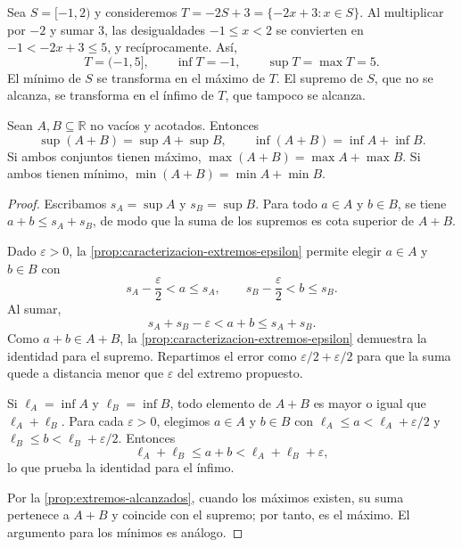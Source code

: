 \begin{example}
Sea $S=[-1,2)$ y consideremos $T=-2S+3=\{-2x+3:x\in S\}$. Al multiplicar por $-2$ y sumar $3$, las desigualdades $-1\leq x<2$ se convierten en $-1<-2x+3\leq5$, y recíprocamente. Así,
\[
 T=(-1,5],\qquad \inf T=-1,\qquad \sup T=\max T=5.
\]
El mínimo de $S$ se transforma en el máximo de $T$. El supremo de $S$, que no se alcanza, se transforma en el ínfimo de $T$, que tampoco se alcanza.
\end{example}

\begin{samepage}
\begin{proposition}
\label{prop:extremos-suma}
Sean $A,B\subseteq\mathbb{R}$ no vacíos y acotados. Entonces
\[
 \sup(A+B)=\sup A+\sup B,\qquad
 \inf(A+B)=\inf A+\inf B.
\]
Si ambos conjuntos tienen máximo, $\max(A+B)=\max A+\max B$. Si ambos tienen mínimo, $\min(A+B)=\min A+\min B$.
\end{proposition}
\end{samepage}

\begin{proof}
Escribamos $s_A=\sup A$ y $s_B=\sup B$. Para todo $a\in A$ y $b\in B$, se tiene $a+b\leq s_A+s_B$, de modo que la suma de los supremos es cota superior de $A+B$.

Dado $\varepsilon>0$, la \cref{prop:caracterizacion-extremos-epsilon} permite elegir $a\in A$ y $b\in B$ con
\[
 s_A-\frac{\varepsilon}{2}<a\leq s_A,\qquad
 s_B-\frac{\varepsilon}{2}<b\leq s_B.
\]
Al sumar,
\[
 s_A+s_B-\varepsilon<a+b\leq s_A+s_B.
\]
Como $a+b\in A+B$, la \cref{prop:caracterizacion-extremos-epsilon} demuestra la identidad para el supremo. Repartimos el error como $\varepsilon/2+\varepsilon/2$ para que la suma quede a distancia menor que $\varepsilon$ del extremo propuesto.

Si $\ell_A=\inf A$ y $\ell_B=\inf B$, todo elemento de $A+B$ es mayor o igual que $\ell_A+\ell_B$. Para cada $\varepsilon>0$, elegimos $a\in A$ y $b\in B$ con $\ell_A\leq a<\ell_A+\varepsilon/2$ y $\ell_B\leq b<\ell_B+\varepsilon/2$. Entonces
\[
 \ell_A+\ell_B\leq a+b<\ell_A+\ell_B+\varepsilon,
\]
lo que prueba la identidad para el ínfimo.

Por la \cref{prop:extremos-alcanzados}, cuando los máximos existen, su suma pertenece a $A+B$ y coincide con el supremo; por tanto, es el máximo. El argumento para los mínimos es análogo.
\end{proof}

